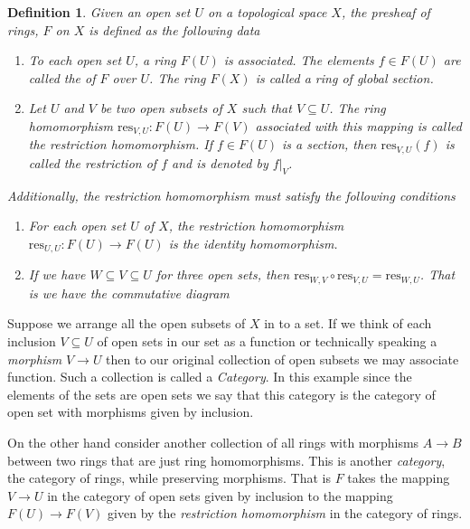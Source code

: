 \documentclass[]{report}
\newtheorem{defn}[theorem]{Definition}
\begin{document}
\begin{defn}
    Given an open set $U$ on a topological space $X$, the \textit{presheaf of rings}, $F$ on $X$ is defined as the following data
\begin{enumerate}
    \item To each open set $U$, a ring $F(U)$ is associated. The elements $f \in F(U)$ are called the  of $F$ over $U$. The ring $F(X)$ is called a ring of \textit{global section}.  
    \item Let $U$ and $V$ be two open subsets of $X$ such that $V \subseteq U$. The ring homomorphism $\text{res}_{V,U}: F(U) \rightarrow F(V)$ associated with this mapping is called the \textit{restriction homomorphism}. If $f \in F(U)$ is a section, then $\text{res}_{V,U}(f)$ is called the restriction of $f$ and is denoted by $f|_{V}$.
    \end{enumerate}

Additionally, the restriction homomorphism must satisfy the following conditions
\begin{enumerate}
    \item For each open set $U$ of $X$, the restriction homomorphism $\text{res}_{U,U}: F(U) \rightarrow F(U)$ is the identity homomorphism.
    \item If we have $W \subseteq V \subseteq U$ for three open sets, then $\text{res}_{W,V} \circ \text{res}_{V,U} = \text{res}_{W,U}$. That is we have the commutative diagram

\end{enumerate}
\end{defn}

Suppose we arrange all the open subsets of $X$ in to a set. If we think of each inclusion $V \subseteq U$ of open sets in our set as a function or technically speaking a \textit{morphism} $V \rightarrow U$ then to our original collection of open subsets we may associate function. Such a collection is called a \textit{Category}. In this example since the elements of the sets are open sets we say that this category is the category of open set with morphisms given by inclusion.

On the other hand consider another collection of all rings with morphisms $A \rightarrow B$ between two rings that are just ring homomorphisms. This is another \textit{category}, the category of rings, while preserving morphisms. That is $F$ takes the mapping $V \rightarrow U$ in the category of open sets given by inclusion to the mapping $F(U) \rightarrow F(V)$ given by the \textit{restriction homomorphism} in the category of rings.
\end{document}
